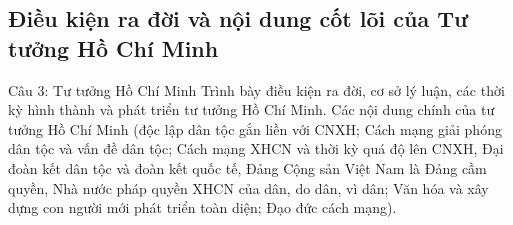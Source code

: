 \documentclass[12pt,a4paper]{article}
\begin{document}
\subsection{Điều kiện ra đời và nội dung cốt lõi của Tư tưởng Hồ Chí Minh}

\begin{questionbox}{Câu 3: Tư tưởng Hồ Chí Minh}
Trình bày điều kiện ra đời, cơ sở lý luận, các thời kỳ hình thành và phát triển tư tưởng Hồ Chí Minh. Các nội dung chính của tư tưởng Hồ Chí Minh (độc lập dân tộc gắn liền với CNXH; Cách mạng giải phóng dân tộc và vấn đề dân tộc; Cách mạng XHCN và thời kỳ quá độ lên CNXH, Đại đoàn kết dân tộc và đoàn kết quốc tế, Đảng Cộng sản Việt Nam là Đảng cầm quyền, Nhà nước pháp quyền XHCN của dân, do dân, vì dân; Văn hóa và xây dựng con người mới phát triển toàn diện; Đạo đức cách mạng).
\end{questionbox}
\end{document}
